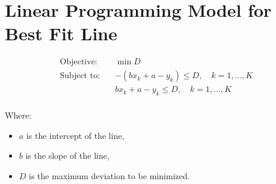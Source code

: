 \documentclass{article}
\begin{document}
\section*{Linear Programming Model for Best Fit Line}

\begin{align*}
\text{Objective:} \quad & \min D \\
\text{Subject to:} \quad & -(b x_k + a - y_k) \leq D, \quad k = 1, \ldots, K \\
                        & b x_k + a - y_k \leq D, \quad k = 1, \ldots, K \\
\end{align*}

Where:
\begin{itemize}
    \item \( a \) is the intercept of the line,
    \item \( b \) is the slope of the line,
    \item \( D \) is the maximum deviation to be minimized.
\end{itemize}
\end{document}
